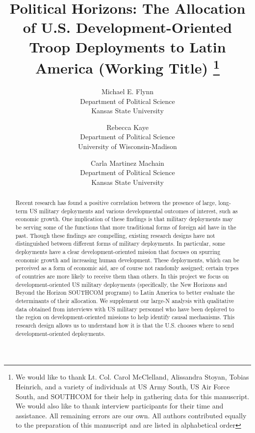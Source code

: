 \documentclass[12pt]{article}
\begin{document}
\title{Political Horizons: The Allocation of U.S. Development-Oriented Troop Deployments to Latin America (Working Title) \thanks{We would like to thank Lt. Col. Carol McClelland, Alissandra Stoyan, Tobias Heinrich, and a variety of individuals at US Army South, US Air Force South, and SOUTHCOM for their help in gathering data for this manuscript. We would also like to thank interview participants for their time and assistance. All remaining errors are our own. All authors contributed equally to the preparation of this manuscript and are listed in alphabetical order}}
\author{Michael E. Flynn \\
Department of Political Science  \\
Kansas State University
\and
Rebecca Kaye \\
Department of Political Science \\
University of Wisconsin-Madison
\and
Carla Martinez Machain \\
Department of Political Science \\
Kansas State University
}
\date{}

\maketitle


\begin{abstract}
\noindent  Recent research has found a positive correlation between the presence of large, long-term US military deployments and various developmental outcomes of interest, such as economic growth. One implication of these findings is that military deployments may be serving some of the functions that more traditional forms of foreign aid have in the past.  Though these findings are compelling, existing research designs have not distinguished between different forms of military deployments. In particular, some deployments have a clear development-oriented mission that focuses on spurring economic growth and increasing human development.  These deployments, which can be perceived as a form of economic aid, are of course not randomly assigned; certain types of countries are more likely to receive them than others. In this project we focus on development-oriented US military deployments (specifically, the New Horizons and Beyond the Horizon SOUTHCOM programs) to Latin America to better evaluate the determinants of their allocation. We supplement our large-N analysis with qualitative data obtained from interviews with US military personnel who have been deployed to the region on development-oriented missions to help identify causal mechanisms. This research design allows us to understand how it is that the U.S. chooses where to send development-oriented deployments. 
\end{abstract}
\vfill
\thispagestyle{empty}
\clearpage
\end{document}
